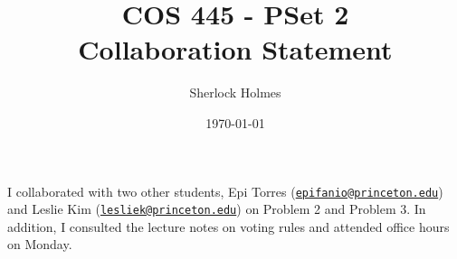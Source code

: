 \documentclass[12pt]{article}%
\begin{document}
\title{COS 445 - PSet 2 \\ Collaboration Statement} %
\author{Sherlock Holmes} %
\date{\today}
\maketitle

I collaborated with two other students, Epi Torres (\href{mailto:epifanio@princeton.edu}{\nolinkurl{epifanio@princeton.edu}}) and Leslie Kim (\href{mailto:lesliek@princeton.edu}{\nolinkurl{lesliek@princeton.edu}}) on Problem 2 and Problem 3. In addition, I consulted the lecture notes on voting rules and attended office hours on Monday.
\end{document}
